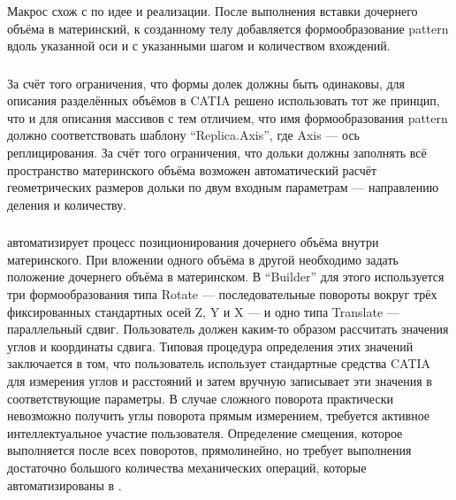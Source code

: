 \subsubsection{}\label{sec:secMacroArrayMaker}


Макрос  схож с  по идее и реализации. После выполнения вставки дочернего объёма в материнский, к созданному телу добавляется формообразование pattern вдоль указанной оси и с указанными шагом и количеством вхождений.

\subsubsection{}\label{sec:secMacroReplica}

За счёт того ограничения, что формы долек должны быть одинаковы, для описания разделённых объёмов в CATIA решено использовать тот же принцип, что и для описания массивов с тем отличием, что имя формообразования pattern должно соответствовать шаблону ``Replica.Axis'', где Axis --- ось реплицирования. За счёт того ограничения, что дольки должны заполнять всё пространство материнского объёма возможен автоматический расчёт геометрических размеров дольки по двум входным параметрам --- направлению деления и количеству.

\subsubsection{}\label{sec:secMacroPtPAligner}

 автоматизирует процесс позиционирования дочернего объёма внутри материнского. При вложении одного объёма в другой необходимо задать положение дочернего объёма в материнском. В ``Builder'' для этого используется три формообразования типа Rotate --- последовательные повороты вокруг трёх фиксированных стандартных осей Z, Y и X --- и одно типа Translate --- параллельный сдвиг. Пользователь должен каким-то образом рассчитать значения углов и координаты сдвига. Типовая процедура определения этих значений заключается в том, что пользователь использует стандартные средства CATIA для измерения углов и расстояний и затем вручную записывает эти значения в соответствующие параметры. В случае сложного поворота практически невозможно получить углы поворота прямым измерением, требуется активное интеллектуальное участие пользователя. Определение смещения, которое выполняется после всех поворотов, прямолинейно, но требует выполнения достаточно большого количества механических операций, которые автоматизированы в .

